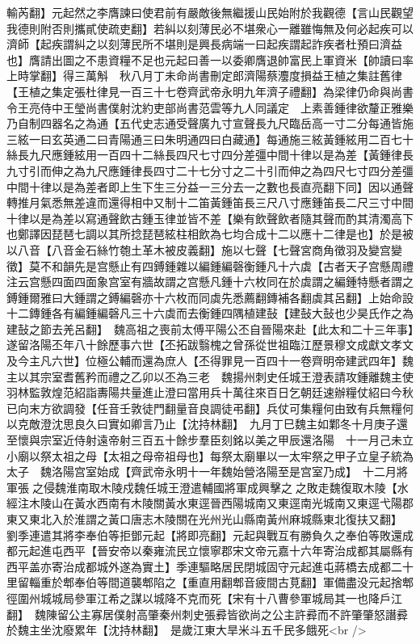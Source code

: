 輸芮翻】元起然之李膺諫曰使君前有嚴敵後無繼援山民始附於我觀德【言山民觀望我德則附否則攜貳使疏吏翻】若糾以刻薄民必不堪衆心一離雖悔無及何必起疾可以濟師【起疾謂糾之以刻薄民所不堪則是興長病端一曰起疾謂起詐疾者杜預曰濟益也】膺請出圖之不患資糧不足也元起曰善一以委卿膺退帥富民上軍資米【帥讀曰率上時掌翻】得三萬斛　秋八月丁未命尚書刪定郎濟陽蔡灋度損益王植之集註舊律【王植之集定張杜律見一百三十七卷齊武帝永明九年濟子禮翻】為梁律仍命與尚書令王亮侍中王瑩尚書僕射沈約吏部尚書范雲等九人同議定　上素善鍾律欲釐正雅樂乃自制四器名之為通【五代史志通受聲廣九寸宣聲長九尺臨岳高一寸二分每通皆施三絃一曰玄英通二曰青陽通三曰朱明通四曰白藏通】每通施三絃黃鍾絃用二百七十絲長九尺應鍾絃用一百四十二絲長四尺七寸四分差彊中間十律以是為差【黃鍾律長九寸引而伸之為九尺應鍾律長四寸二十七分寸之二十引而伸之為四尺七寸四分差彊中間十律以是為差者即上生下生三分益一三分去一之數也長直亮翻下同】因以通聲轉推月氣悉無差違而還得相中又制十二笛黃鍾笛長三尺八寸應鍾笛長二尺三寸中間十律以是為差以寫通聲飲古鍾玉律並皆不差【樂有飲聲飲者隨其聲而酌其清濁高下也鄭譯因琵琶七調以其所捻琵琶絃柱相飲為七均合成十二以應十二律是也】於是被以八音【八音金石絲竹匏土革木被皮義翻】施以七聲【七聲宮商角徵羽及變宫變徵】莫不和韻先是宫懸止有四鎛鍾雜以編鍾編磬衡鍾凡十六虡【古者天子宫懸周禮注云宫懸四面四面象宫室有牆故謂之宫懸凡鍾十六枚同在於虡謂之編鍾特懸者謂之鎛鍾爾雅曰大鍾謂之鎛編磬亦十六枚而同虡先悉薦翻鏄補各翻虡其呂翻】上始命設十二鏄鍾各有編鍾編磬凡三十六虡而去衡鍾四隅植建鼔【建鼔大鼔也少昊氏作之為建鼔之節去羌呂翻】　魏高祖之喪前太傅平陽公丕自晉陽來赴【此太和二十三年事】遂留洛陽丕年八十餘歷事六世【丕拓跋翳槐之曾孫從世祖臨江歷景穆文成獻文孝文及今主凡六世】位極公輔而還為庶人【丕得罪見一百四十一卷齊明帝建武四年】魏主以其宗室耆舊矜而禮之乙卯以丕為三老　魏揚州刺史任城王澄表請攻鍾離魏主使羽林監敦煌范紹詣夀陽共量進止澄曰當用兵十萬往來百日乞朝廷速辦糧仗紹曰今秋已向末方欲調發【任音壬敦徒門翻量音良調徒弔翻】兵仗可集糧何由致有兵無糧何以克敵澄沈思良久曰實如卿言乃止【沈持林翻】　九月丁巳魏主如鄴冬十月庚子還至懷與宗室近侍射遠帝射三百五十餘步羣臣刻銘以美之甲辰還洛陽　十一月己未立小廟以祭太祖之母【太祖之母帝祖母也】每祭太廟畢以一太牢祭之甲子立皇子統為太子　魏洛陽宫室始成【齊武帝永明十一年魏始營洛陽至是宫室乃成】　十二月將軍張之侵魏淮南取木陵戍魏任城王澄遣輔國將軍成興擊之之敗走魏復取木陵【水經注木陵山在黃水西南有木陵關黃水東逕晉西陽城南又東逕南光城南又東逕弋陽郡東又東北入於淮謂之黃口唐志木陵關在光州光山縣南黃州麻城縣東北復扶又翻】　劉季連遣其將李奉伯等拒鄧元起【將即亮翻】元起與戰互有勝負久之奉伯等敗還成都元起進屯西平【晉安帝以秦雍流民立懷寧郡宋文帝元嘉十六年寄治成都其屬縣有西平盖亦寄治成都城外遂為實土】季連驅略居民閉城固守元起進屯蔣橋去成都二十里留輜重於郫奉伯等間道襲郫陷之【重直用翻郫音疲間古莧翻】軍備盡没元起捨郫徑圍州城城局參軍江希之謀以城降不克而死【宋有十八曹參軍城局其一也降戶江翻】　魏陳留公主寡居僕射高肇秦州刺史張彛皆欲尚之公主許彛而不許肇肇怒譖彛於魏主坐沈廢累年【沈持林翻】　是歲江東大旱米斗五千民多餓死<br />
